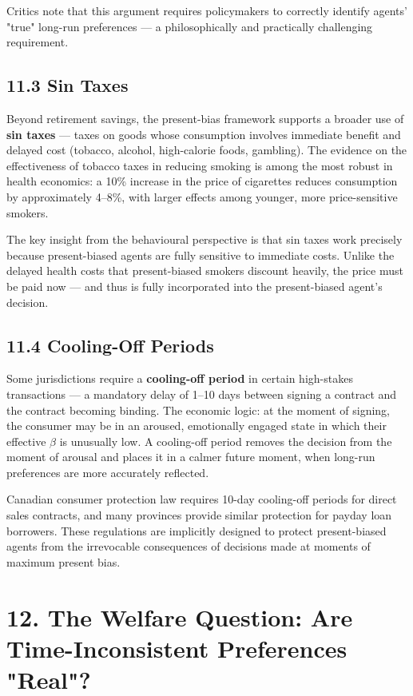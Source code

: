 \documentclass[12pt, letterpaper]{article}
\begin{document}
Critics note that this argument requires policymakers to correctly identify agents' "true" long-run preferences --- a philosophically and practically challenging requirement.


\subsection{11.3 Sin Taxes}


Beyond retirement savings, the present-bias framework supports a broader use of \textbf{sin taxes} --- taxes on goods whose consumption involves immediate benefit and delayed cost (tobacco, alcohol, high-calorie foods, gambling). The evidence on the effectiveness of tobacco taxes in reducing smoking is among the most robust in health economics: a 10\% increase in the price of cigarettes reduces consumption by approximately 4--8\%, with larger effects among younger, more price-sensitive smokers.

The key insight from the behavioural perspective is that sin taxes work precisely because present-biased agents are fully sensitive to immediate costs. Unlike the delayed health costs that present-biased smokers discount heavily, the price must be paid now --- and thus is fully incorporated into the present-biased agent's decision.


\subsection{11.4 Cooling-Off Periods}


Some jurisdictions require a \textbf{cooling-off period} in certain high-stakes transactions --- a mandatory delay of 1--10 days between signing a contract and the contract becoming binding. The economic logic: at the moment of signing, the consumer may be in an aroused, emotionally engaged state in which their effective $\beta$ is unusually low. A cooling-off period removes the decision from the moment of arousal and places it in a calmer future moment, when long-run preferences are more accurately reflected.

Canadian consumer protection law requires 10-day cooling-off periods for direct sales contracts, and many provinces provide similar protection for payday loan borrowers. These regulations are implicitly designed to protect present-biased agents from the irrevocable consequences of decisions made at moments of maximum present bias.

\medskip


\section{12. The Welfare Question: Are Time-Inconsistent Preferences "Real"?}
\end{document}
